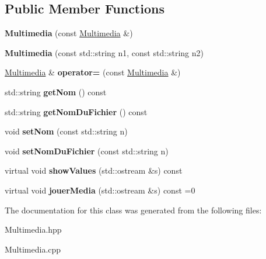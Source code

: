 \subsection*{Public Member Functions}
\begin{DoxyCompactItemize}
\item 
\mbox{\label{class_multimedia_a4eccb62497a4eb02193b90857939a6bb}} 
{\bfseries Multimedia} (const \mbox{\hyperlink{class_multimedia}{Multimedia}} \&)
\item 
\mbox{\label{class_multimedia_aca7a4c425c52c746fb6c1da74d37d998}} 
{\bfseries Multimedia} (const std\+::string n1, const std\+::string n2)
\item 
\mbox{\label{class_multimedia_a1eabdd87ffbe351d8ec4fb67a7ec2f65}} 
\mbox{\hyperlink{class_multimedia}{Multimedia}} \& {\bfseries operator=} (const \mbox{\hyperlink{class_multimedia}{Multimedia}} \&)
\item 
\mbox{\label{class_multimedia_ab9228c137d2358671195c74b7b782b45}} 
std\+::string {\bfseries get\+Nom} () const
\item 
\mbox{\label{class_multimedia_ac3c32e69af844ed5ea04c6c45993e64d}} 
std\+::string {\bfseries get\+Nom\+Du\+Fichier} () const
\item 
\mbox{\label{class_multimedia_ae54be360886068ab70fa8f0d91f0adbd}} 
void {\bfseries set\+Nom} (const std\+::string n)
\item 
\mbox{\label{class_multimedia_ac03692fc603ea0c82f98ffeb183f0ce9}} 
void {\bfseries set\+Nom\+Du\+Fichier} (const std\+::string n)
\item 
\mbox{\label{class_multimedia_a7f15308ac3901154ef34d121838771fd}} 
virtual void {\bfseries show\+Values} (std\+::ostream \&s) const
\item 
\mbox{\label{class_multimedia_ad62850bb90b1b40db8baed783dd21515}} 
virtual void {\bfseries jouer\+Media} (std\+::ostream \&s) const =0
\end{DoxyCompactItemize}


The documentation for this class was generated from the following files\+:\begin{DoxyCompactItemize}
\item 
Multimedia.\+hpp\item 
Multimedia.\+cpp\end{DoxyCompactItemize}
